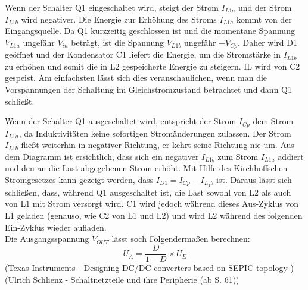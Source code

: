 Wenn der Schalter Q1 eingeschaltet wird, steigt der Strom \(I_{L1a}\) und der Strom \(I_{L1b}\) 
wird negativer. Die Energie zur Erhöhung des Stroms \(I_{L1a}\) kommt von der Eingangsquelle. 
Da Q1 kurzzeitig geschlossen ist und die momentane Spannung \(V_{L1a}\) ungefähr \(V_{in}\) 
beträgt, ist die Spannung \(V_{L1b}\) ungefähr \(- V_{Cp}\). Daher wird D1 geöffnet und der 
Kondensator C1 liefert die Energie, um die Stromstärke in \(I_{L1b}\) zu erhöhen und somit 
die in L2 gespeicherte Energie zu steigern. IL wird von C2 gespeist. Am einfachsten lässt 
sich dies veranschaulichen, wenn man die Vorspannungen der Schaltung im Gleichstromzustand 
betrachtet und dann Q1 schließt.

Wenn der Schalter Q1 ausgeschaltet wird, entspricht der Strom \(I_{Cp}\) dem Strom \(I_{L1a}\), 
da Induktivitäten keine sofortigen Stromänderungen zulassen. Der Strom \(I_{L1b}\) fließt weiterhin 
in negativer Richtung, er kehrt seine Richtung nie um. Aus dem Diagramm ist ersichtlich, dass sich 
ein negativer \(I_{L1b}\) zum Strom \(I_{L1a}\) addiert und den an die Last abgegebenen Strom erhöht. 
Mit Hilfe des Kirchhoffschen Stromgesetzes kann gezeigt werden, dass \(I_{D1} = I_{Cp} - I_{L_1b}\) ist. 
Daraus lässt sich schließen, dass, während Q1 ausgeschaltet ist, die Last sowohl von L2 als auch 
von L1 mit Strom versorgt wird. C1 wird jedoch während dieses Aus-Zyklus von L1 geladen 
(genauso, wie C2 von L1 und L2) und wird L2 während des folgenden Ein-Zyklus wieder aufladen. \\ 
Die Ausgangsspannung \(V_{OUT}\) lässt soch Folgendermaßen berechnen:
\[U_A = \frac{D}{1 - D} \times U_E\]
(Texas Instruments - Designing DC/DC converters based on \ac{SEPIC} topology \cite{sepic}) \\
(Ulrich Schlienz - Schaltnetzteile und ihre Peripherie \cite{Schlienz2020}(ab S. 61))
